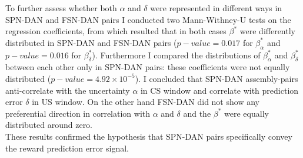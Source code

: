 To further assess whether both $\alpha$ and $\delta$ were represented in different ways in SPN-DAN and FSN-DAN pairs I conducted two Mann-Withney-U tests on the regression coefficients, from which resulted that in both cases $\beta^*$ were differently distributed in SPN-DAN and FSN-DAN pairs ($p-value=0.017$ for $\beta^*_{\alpha}$ and $p-value=0.016$ for $\beta^*_{\delta}$). Furthermore I compared the distributions of $\beta^*_{\alpha}$ and $\beta^*_{\delta}$ between each other only in SPN-DAN pairs: these coefficients were not equally distributed ($p-value=4.92\times10^{-5}$). I concluded that SPN-DAN assembly-pairs anti-correlate with the uncertainty $\alpha$ in CS window and correlate with prediction error $\delta$ in US window. On the other hand FSN-DAN did not show any preferential direction in correlation with $\alpha$ and $\delta$ and the $\beta^*$ were equally distributed around zero.\\These results confirmed the hypothesis that SPN-DAN pairs specifically convey the reward prediction error signal.
